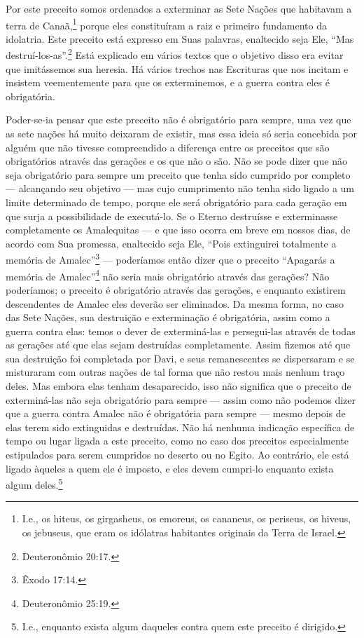 Por este preceito somos ordenados a exterminar as Sete Nações que
habitavam a terra de Canaã,\footnote{I.e., os hiteus, os girgasheus, os emoreus, os cananeus, os periseus,
  os hiveus, os jebuseus, que eram os idólatras habitantes originais da
  Terra de Israel.} porque eles
constituíram a raiz e primeiro fundamento da idolatria. Este preceito
está expresso em Suas palavras, enaltecido seja Ele, ``Mas
destruí-los-as''.\footnote{Deuteronômio 20:17.} Está explicado em vários textos
que o objetivo disso era evitar que imitássemos sua heresia. Há vários
trechos nas Escrituras que nos incitam e insistem veementemente para que
os exterminemos, e a guerra contra eles é obrigatória.

Poder-se-ia pensar que este preceito não é obrigatório para sempre, uma
vez que as sete nações há muito deixaram de existir, mas essa ideia só
seria concebida por alguém que não tivesse compreendido a diferença
entre os preceitos que são obrigatórios através das gerações e os que não o são. Não
se pode dizer que não seja obrigatório para sempre um preceito que
tenha sido cumprido por completo --- alcançando seu objetivo --- mas
cujo cumprimento não tenha sido ligado a um limite determinado de tempo,
porque ele será obrigatório para cada geração em que surja a
possibilidade de executá-lo. Se o Eterno destruísse e exterminasse
completamente os Amalequitas --- e que isso ocorra em breve em nossos
dias, de acordo com Sua promessa, enaltecido seja Ele, ``Pois
extinguirei totalmente a memória de Amalec''\footnote{Êxodo 17:14.} ---
poderíamos então dizer que o preceito ``Apagarás a memória de Amalec''\footnote{Deuteronômio 25:19.} não seria mais obrigatório através das gerações?
Não poderíamos; o preceito é obrigatório através das gerações, e
enquanto existirem descendentes de Amalec eles deverão ser eliminados.
Da mesma forma, no caso das Sete Nações, sua destruição e exterminação é
obrigatória, assim como a guerra contra elas: temos o dever de
exterminá-las e persegui-las através de todas as gerações até que elas
sejam destruídas completamente. Assim fizemos até que sua destruição foi
completada por Davi, e seus remanescentes se dispersaram e se misturaram
com outras nações de tal forma que não restou mais nenhum traço deles.
Mas embora elas tenham desaparecido, isso não significa que o preceito
de exterminá-las não seja obrigatório para sempre --- assim como não
podemos dizer que a guerra contra Amalec não é obrigatória para sempre
--- mesmo depois de elas terem sido extinguidas e destruídas. Não há
nenhuma indicação específica de tempo ou lugar ligada a este preceito, como no caso dos
preceitos especialmente estipulados para serem cumpridos no deserto ou no Egito.
Ao contrário, ele está ligado àqueles a quem ele é imposto, e eles devem
cumpri-lo enquanto exista algum deles.\footnote{I.e., enquanto exista algum daqueles contra quem este preceito é dirigido.}

